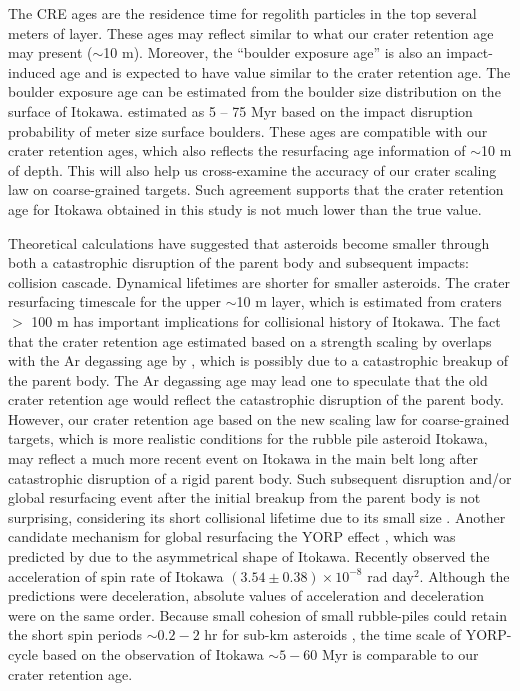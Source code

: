 \documentclass[3p,authoryear]{elsarticle}
\begin{document}
The CRE ages are the residence time for regolith particles in the top several meters of layer. These ages may reflect similar to what our crater retention age may present ($\sim$10 m). Moreover, the ``boulder exposure age'' is also an impact-induced age and is expected to have value similar to the crater retention age. The boulder exposure age can be estimated from the boulder size distribution on the surface of Itokawa. \citet{basilevsky2014} estimated as 5 -- 75 Myr based on the impact disruption probability of meter size surface boulders. These ages are compatible with our crater retention ages, which also reflects the resurfacing age information of $\sim$10 m of depth. This will also help us cross-examine the accuracy of our crater scaling law on coarse-grained targets. Such agreement supports that the crater retention age for Itokawa obtained in this study is not much lower than the true value.

Theoretical calculations have suggested that asteroids become smaller through both a catastrophic disruption of the parent body and subsequent impacts: collision cascade. Dynamical lifetimes are shorter for smaller asteroids. The crater resurfacing timescale for the upper $\sim$10 m layer, which is estimated from craters $>$ 100 m has important implications for collisional history of Itokawa. The fact that the crater retention age estimated based on a strength scaling by \citet{michel2009} overlaps with the Ar degassing age by \citet{park2015}, which is possibly due to a catastrophic breakup of the parent body. The Ar degassing age may lead one to speculate that the old crater retention age would reflect the catastrophic disruption of the parent body. However, our crater retention age based on the new scaling law for coarse-grained targets, which is more realistic conditions for the rubble pile asteroid Itokawa, may reflect a much more recent event on Itokawa in the main belt long after catastrophic disruption of a rigid parent body. Such subsequent disruption and/or global resurfacing event after the initial breakup from the parent body is not surprising, considering its short collisional lifetime due to its small size \citep[e.g.,][]{obrien2005}. 
Another candidate mechanism for global resurfacing the YORP effect \citep{bottke2006}, which was predicted by \citet{scheeres2008,breiter2009}due to the asymmetrical shape of Itokawa. Recently \citet{lowry2014} observed the acceleration of spin rate of Itokawa $(3.54\pm0.38)\times10^{-8}$ rad day$^2$. Although the predictions were deceleration, absolute values of acceleration and deceleration were on the same order. Because small cohesion of small rubble-piles could retain the short spin periods $\sim0.2-2$ hr for sub-km asteroids \citet{sanchez2014}, the time scale of YORP-cycle based on the observation of Itokawa $\sim 5-60$ Myr is comparable to our crater retention age. 
\end{document}

